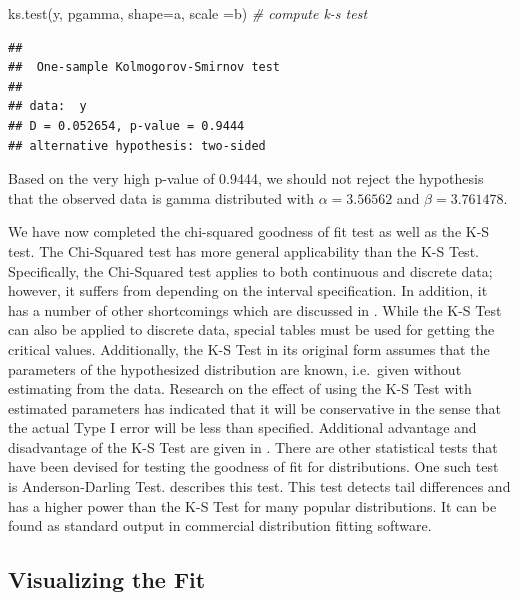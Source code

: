\documentclass[
]{book}
\newenvironment{Shaded}{\begin{snugshade}}{\end{snugshade}}
\newcommand{\AttributeTok}[1]{\textcolor[rgb]{0.77,0.63,0.00}{#1}}
\newcommand{\CommentTok}[1]{\textcolor[rgb]{0.56,0.35,0.01}{\textit{#1}}}
\newcommand{\FunctionTok}[1]{\textcolor[rgb]{0.00,0.00,0.00}{#1}}
\newcommand{\NormalTok}[1]{#1}
\newcommand{\StringTok}[1]{\textcolor[rgb]{0.31,0.60,0.02}{#1}}
\theoremstyle{definition}
\theoremstyle{definition}
\theoremstyle{definition}
\theoremstyle{definition}
\theoremstyle{remark}
\begin{document}
\begin{Shaded}
\begin{Highlighting}[]
\FunctionTok{ks.test}\NormalTok{(y, }\StringTok{\textquotesingle{}pgamma\textquotesingle{}}\NormalTok{, }\AttributeTok{shape=}\NormalTok{a, }\AttributeTok{scale =}\NormalTok{b) }\CommentTok{\# compute k{-}s test}
\end{Highlighting}
\end{Shaded}

\begin{verbatim}
## 
##  One-sample Kolmogorov-Smirnov test
## 
## data:  y
## D = 0.052654, p-value = 0.9444
## alternative hypothesis: two-sided
\end{verbatim}

Based on the very high p-value of 0.9444, we should not reject the
hypothesis that the observed data is gamma distributed with
\(\alpha = 3.56562\) and \(\beta = 3.761478\).

We have now completed the chi-squared goodness of fit test as well as
the K-S test. The Chi-Squared test has more general applicability than
the K-S Test. Specifically, the Chi-Squared test applies to both
continuous and discrete data; however, it suffers from depending on the
interval specification. In addition, it has a number of other
shortcomings which are discussed in \citep{law2007simulation}. While the K-S
Test can also be applied to discrete data, special tables must be used
for getting the critical values. Additionally, the K-S Test in its
original form assumes that the parameters of the hypothesized
distribution are known, i.e.~given without estimating from the data.
Research on the effect of using the K-S Test with estimated parameters
has indicated that it will be conservative in the sense that the actual
Type I error will be less than specified. Additional advantage and
disadvantage of the K-S Test are given in \citep{law2007simulation}. There
are other statistical tests that have been devised for testing the
goodness of fit for distributions. One such test is Anderson-Darling
Test. \citep{law2007simulation} describes this test. This test detects tail
differences and has a higher power than the K-S Test for many popular
distributions. It can be found as standard output in commercial
distribution fitting software.

\hypertarget{app:idm:subsec:visFit}{%
\subsection{Visualizing the Fit}\label{app:idm:subsec:visFit}}
\end{document}
